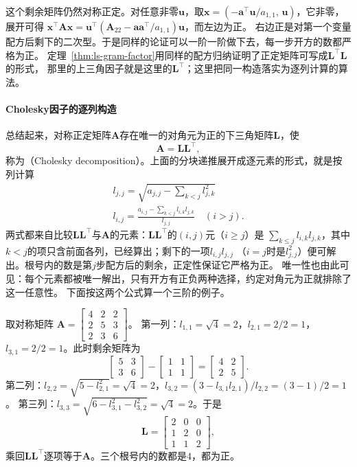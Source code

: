 这个剩余矩阵仍然对称正定。对任意非零$\bm u$，取$\bm x=(-\bm a^\top\bm u/a_{1,1},\,\bm u)$，它非零，展开可得
$\bm x^\top\bm A\bm x=\bm u^\top(\bm A_{22}-\bm a\bm a^\top/a_{1,1})\bm u$，而左边为正。
右边正是对第一个变量配方后剩下的二次型。于是同样的论证可以一阶一阶做下去，每一步开方的数都严格为正。
定理~\ref{thm:ls-gram-factor}用同样的配方归纳证明了正定矩阵可写成$\bm L^\top\bm L$的形式，
那里的上三角因子就是这里的$\bm L^\top$；这里把同一构造落实为逐列计算的算法。

\paragraph{Cholesky因子的逐列构造}

总结起来，对称正定矩阵$\bm A$存在唯一的对角元为正的下三角矩阵$\bm L$，使
\begin{equation}
 \bm A=\bm L\bm L^\top,
 \label{eq:matrix-analysis-cholesky}
\end{equation}
称为（Cholesky decomposition）。上面的分块递推展开成逐元素的形式，就是按列计算
\begin{equation}
\begin{gathered}
l_{j,j}=\sqrt{a_{j,j}-\sum_{k<j}l_{j,k}^2}\\
l_{i,j}=\frac{a_{i,j}-\sum_{k<j}l_{i,k}l_{j,k}}{l_{j,j}}\quad(i>j).
\end{gathered}
\end{equation}
两式都来自比较$\bm L\bm L^\top$与$\bm A$的元素：$\bm L\bm L^\top$的$(i,j)$元（$i\geq j$）是
$\sum_{k\leq j}l_{i,k}l_{j,k}$，其中$k<j$的项只含前面各列，已经算出；剩下的一项$l_{i,j}l_{j,j}$
（$i=j$时是$l_{j,j}^2$）便可解出。根号内的数是第$j$步配方后的剩余，正定性保证它严格为正。
唯一性也由此可见：每个元素都被唯一解出，只有开方有正负两种选择，约定对角元为正就排除了这一任意性。
下面按这两个公式算一个三阶的例子。

\begin{example}[逐列计算Cholesky因子]
\label{ex:ls-cholesky-three-by-three}
取对称矩阵
$\bm A=\left[\begin{smallmatrix}4&2&2\\2&5&3\\2&3&6\end{smallmatrix}\right]$。
第一列：$l_{1,1}=\sqrt4=2$，$l_{2,1}=2/2=1$，$l_{3,1}=2/2=1$。此时剩余矩阵为
\[
 \begin{bmatrix}5&3\\3&6\end{bmatrix}-\begin{bmatrix}1&1\\1&1\end{bmatrix}
 =\begin{bmatrix}4&2\\2&5\end{bmatrix}.
\]
第二列：$l_{2,2}=\sqrt{5-l_{2,1}^2}=\sqrt4=2$，$l_{3,2}=(3-l_{3,1}l_{2,1})/l_{2,2}=(3-1)/2=1$。
第三列：$l_{3,3}=\sqrt{6-l_{3,1}^2-l_{3,2}^2}=\sqrt4=2$。于是
\[
 \bm L=\begin{bmatrix}2&0&0\\1&2&0\\1&1&2\end{bmatrix},
\]
乘回$\bm L\bm L^\top$逐项等于$\bm A$。三个根号内的数都是$4$，都为正。
\end{example}

